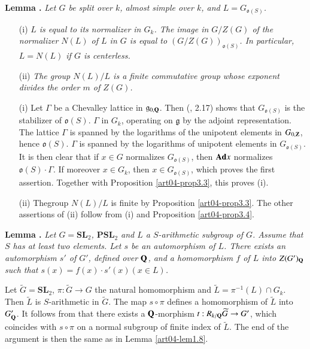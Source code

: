 \medskip
\noindent
{\bf Lemma .\label{art04-lem4.1}}
{\em Let $G$ be split over $k$, almost simple over $k$, and $L=G_{\mathfrak{o}(S)}$.}
\begin{itemize}
\item[{\rm(i)}] {\em $L$ is equal to its normalizer in $G_{k}$. The image in $G/Z(G)$ of the normalizer $N(L)$ of $L$ in $G$ is equal to $(G/Z(G))_{\mathfrak{o}(S)}$. In particular, $L=N(L)$ if $G$ is centerless.}

\item[{\rm(ii)}] {\em The group $N(L)/L$ is a finite commutative group whose exponent divides the order $m$ of $Z(G)$.}
\end{itemize}

\medskip

\begin{itemize}
\item[(i)] Let $\Gamma$ be a Chevalley lattice in $\mathfrak{g}_{0,\mathbf{Q}}$. Then (\cite{art04-key16}, 2.17) shows that $G_{\mathfrak{o}(S)}$ is the stabilizer of $\mathfrak{o}(S)$. $\Gamma$ in $G_{k}$, operating on $\mathfrak{g}$ by the adjoint representation. The lattice $\Gamma$ is spanned by the logarithms of the unipotent elements in $G_{0,\mathbf{Z}}$, hence $\mathfrak{o}(S)$. $\Gamma$ is spanned by the logarithms of unipotent elements in $G_{\mathfrak{o}(S)}$. It is then clear that if $x\in G$ normalizes $G_{\mathfrak{o}(S)}$, then $\mathbf{Ad} x$ normalizes $\mathfrak{o}(S)\cdot \Gamma$. If moreover $x\in G_{k}$, then $x\in G_{\mathfrak{o}(S)}$, which proves the first assertion. Together with Proposition \ref{art04-prop3.3}, this proves (i).

\item[(ii)] The\pageoriginale group $N(L)/L$ is finite by Proposition \ref{art04-prop3.3}. The other assertions of (ii) follow from (i) and Proposition \ref{art04-prop3.4}.
\end{itemize}

\medskip
\noindent
{\bf Lemma .\label{art04-lem4.2}}
{\em Let $G=\mathbf{SL}_{2}$, $\mathbf{PSL}_{2}$ and $L$ a $S$-arithmetic subgroup of $G$. Assume that $S$ has at least two elements. Let $s$ be an automorphism of $L$. There exists an automorphism $s'$ of $G'$, defined over $\mathbf{Q}$, and a homomorphism $f$ of $L$ into $Z(G')_{\mathbf{Q}}$ such that $s(x)=f(x)\cdot s'(x)(x\in L)$.}
\smallskip

Let $\widetilde{G}=\mathbf{SL}_{2}$, $\pi :\widetilde{G}\to G$ the natural homomorphism and $\widetilde{L}=\pi^{-1}(L)\cap G_{k}$. Then $\widetilde{L}$ is $S$-arithmetic in $\widetilde{G}$. The map $s\circ \pi$ defines a homomorphism of $\widetilde{L}$ into $G'_{\mathbf{Q}}$. It follows from \cite{art04-key29} that there exists a $\mathbf{Q}$-morphism $t:R_{k/\mathbf{Q}}\widetilde{G}\to G'$, which coincides with $s\circ \pi$ on a normal subgroup of finite index of $\widetilde{L}$. The end of the argument is then the same as in Lemma \ref{art04-lem1.8}.

